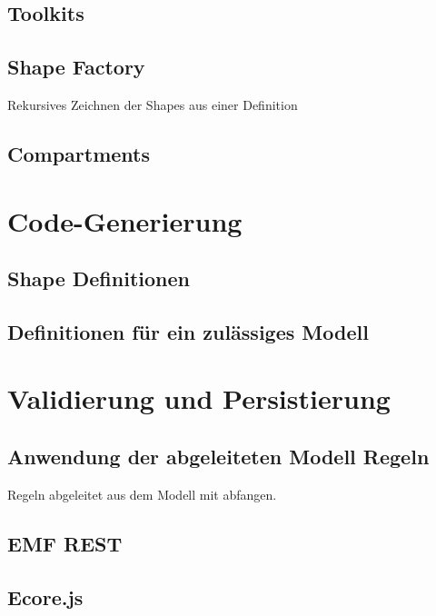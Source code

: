 \subsection{Toolkits}

\subsection{\dd}

\citep{dd}

\subsection{Shape Factory}

Rekursives Zeichnen der Shapes aus einer Definition

\subsection{Compartments}


\section{Code-Generierung}

\subsection{Shape Definitionen}

\subsection{Definitionen für ein zulässiges Modell}


\section{Validierung und Persistierung}

\subsection{Anwendung der abgeleiteten Modell Regeln}

Regeln abgeleitet aus dem Modell mit \dd abfangen.

\subsection{EMF REST}

\subsection{Ecore.js}

